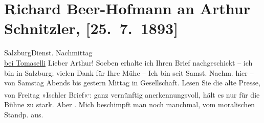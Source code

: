 

         
         \renewcommand{\erwaehntePersonen}{Personen: Julius Bauer, Bertha Flegmann, Carl Freund, Paul Horn, Josef Jarno, Felix Salten, Hermine von Schaffgotsch,  Waldner,  Waldner, Grethe Wreden}
         \renewcommand{\erwaehnteInstitutionen}{Institutionen: Freund {\kaufmannsund}  Jeckel}
         \renewcommand{\erwaehnteOrte}{Orte: Bad Ischl, Berlin, Café Tomaselli, Dauphiné, Salzburg, Wien}
         \renewcommand{\erwaehnteWerke}{Werke: Aus Ischl, Die Presse}
               \section[Richard Beer-Hofmann an Arthur Schnitzler, {[}25. 7. 1893{]}]{ Richard Beer-Hofmann an Arthur Schnitzler, {[}25. 7. 1893{]}}\nopagebreak{}\rehead{ }\begin{ledgroupsized}[t]{13cm}\normalsize\beginnumbering \toendnotes[C]{\smallbreak\pagebreak[2]} 
\toendnotes[C]{\smallbreak}\pstart
           \raggedleft{}{\pb}SalzburgDienst.{ }Nachmittag{\\}\uline{bei Tomaselli}\pend
           \pstart
           Lieber Arthur! Soeben erhalte ich Ihren Brief nachgeschickt – ich
               bin in Salzburg; vielen Dank für Ihre Mühe – Ich bin
               seit Samst.{ }Nachm. hier – von Samstag{ }Abends bis gestern{ }Mittag in Gesellschaft. Lesen Sie die alte Presse, von Freitag »Ischler
                  Brief«\substVorne{}\textsuperscript{,}\substDazwischen{}:\substHinten{} ganz vernünftig {\pb}anerkennungsvoll, hält es nur für die Bühne zu stark. Aber . Mich beschimpft man noch manchmal, vom moralischen
               Standp. aus.\pend
           \pstart

\end{ledgroupsized}
